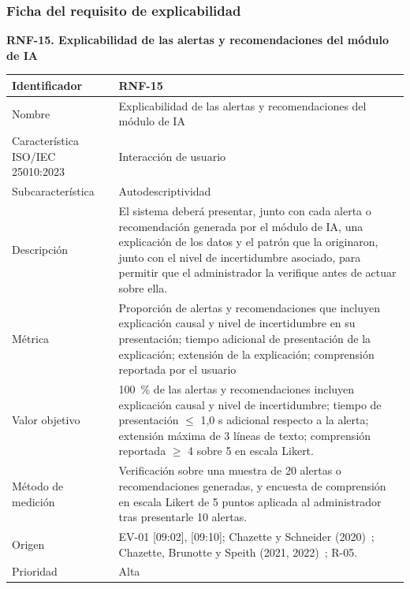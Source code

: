 \documentclass[12pt,a4paper]{article}
\begin{document}
\subsubsection{Ficha del requisito de explicabilidad}
\label{sec:ficha-explicabilidad}

\bigskip
\noindent\textbf{RNF-15. Explicabilidad de las alertas y recomendaciones del módulo de IA}
\label{tab:RNF-15}

\begin{center}
\begin{longtable}{|p{4.2cm}|p{10cm}|}
\hline
Identificador & RNF-15 \\
\hline
Nombre & Explicabilidad de las alertas y recomendaciones del módulo de IA \\
\hline
Característica ISO/IEC 25010:2023 & Interacción de usuario \\
\hline
Subcaracterística & Autodescriptividad \\
\hline
Descripción & El sistema deberá presentar, junto con cada alerta o recomendación generada por el módulo de IA, una explicación de los datos y el patrón que la originaron, junto con el nivel de incertidumbre asociado, para permitir que el administrador la verifique antes de actuar sobre ella. \\
\hline
Métrica & Proporción de alertas y recomendaciones que incluyen explicación causal y nivel de incertidumbre en su presentación; tiempo adicional de presentación de la explicación; extensión de la explicación; comprensión reportada por el usuario \\
\hline
Valor objetivo & 100~\% de las alertas y recomendaciones incluyen explicación causal y nivel de incertidumbre; tiempo de presentación $\leq$ 1,0 s adicional respecto a la alerta; extensión máxima de 3 líneas de texto; comprensión reportada $\geq$ 4 sobre 5 en escala Likert. \\
\hline
Método de medición & Verificación sobre una muestra de 20 alertas o recomendaciones generadas, y encuesta de comprensión en escala Likert de 5 puntos aplicada al administrador tras presentarle 10 alertas. \\
\hline
Origen & EV-01 [09:02], [09:10]; Chazette y Schneider (2020)~\cite{chazette2020}; Chazette, Brunotte y Speith (2021, 2022)~\cite{chazette2021,chazette2022}; R-05. \\
\hline
Prioridad & Alta \\
\hline
\end{longtable}
\end{center}



\end{document}
